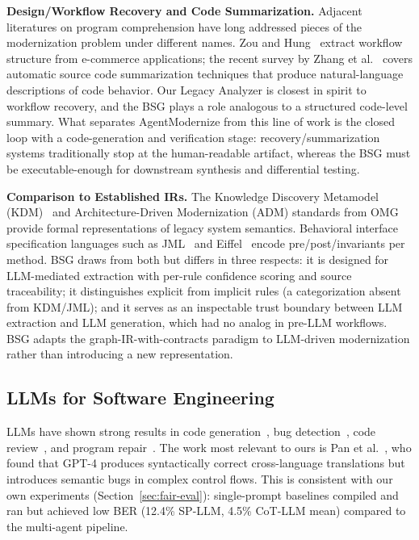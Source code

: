 \documentclass[conference]{IEEEtran}
\begin{document}
\textbf{Design/Workflow Recovery and Code Summarization.} Adjacent literatures on program comprehension have long addressed pieces of the modernization problem under different names. Zou and Hung~\cite{zou2006workflow} extract workflow structure from e-commerce applications; the recent survey by Zhang et al.~\cite{zhang2024summarization} covers automatic source code summarization techniques that produce natural-language descriptions of code behavior. Our Legacy Analyzer is closest in spirit to workflow recovery, and the BSG plays a role analogous to a structured code-level summary. What separates AgentModernize from this line of work is the closed loop with a code-generation and verification stage: recovery/summarization systems traditionally stop at the human-readable artifact, whereas the BSG must be executable-enough for downstream synthesis and differential testing.

\textbf{Comparison to Established IRs.} The Knowledge Discovery Metamodel (KDM)~\cite{omg2016kdm} and Architecture-Driven Modernization (ADM) standards from OMG provide formal representations of legacy system semantics. Behavioral interface specification languages such as JML~\cite{leavens1999jml} and Eiffel~\cite{meyer1992dbc} encode pre/post/invariants per method. BSG draws from both but differs in three respects: it is designed for LLM-mediated extraction with per-rule confidence scoring and source traceability; it distinguishes explicit from implicit rules (a categorization absent from KDM/JML); and it serves as an inspectable trust boundary between LLM extraction and LLM generation, which had no analog in pre-LLM workflows. BSG adapts the graph-IR-with-contracts paradigm to LLM-driven modernization rather than introducing a new representation.

\subsection{LLMs for Software Engineering}

LLMs have shown strong results in code generation~\cite{chen2021evaluating}, bug detection~\cite{li2023llmanalysis}, code review~\cite{li2022codereviewer}, and program repair~\cite{xia2022repair}. The work most relevant to ours is Pan et al.~\cite{pan2024lost}, who found that GPT-4 produces syntactically correct cross-language translations but introduces semantic bugs in complex control flows. This is consistent with our own experiments (Section~\ref{sec:fair-eval}): single-prompt baselines compiled and ran but achieved low BER (12.4\% SP-LLM, 4.5\% CoT-LLM mean) compared to the multi-agent pipeline.
\end{document}
